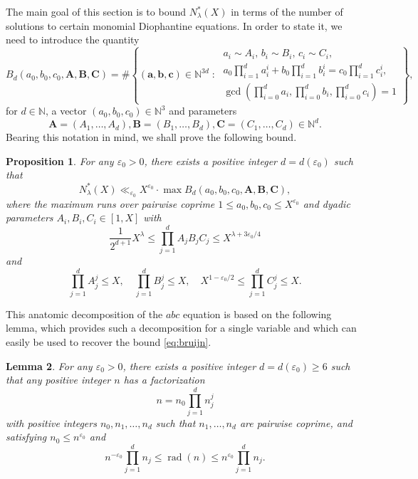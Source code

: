 \documentclass[a4paper,11pt,twoside,reqno]{amsart}
\def\ab{\mathbf{a}}
\def\bb{\mathbf{b}}
\def\cb{\mathbf{c}}
\def\Ab{\mathbf{A}}
\def\Bb{\mathbf{B}}
\def\Cb{\mathbf{C}}
\newcommand\NN{\mathbb{N}}
\renewcommand{\leq}{\leqslant}
\renewcommand{\le}{\leqslant}
\renewcommand{\geq}{\geqslant}
\theoremstyle{plain}
\newtheorem{prop}{Proposition}
\newtheorem{lemma}[prop]{Lemma}
\theoremstyle{remark}
\DeclareMathOperator\rad{rad}
\numberwithin{prop}{section}
\numberwithin{equation}{section}
\begin{document}
The main goal of this section is to bound 
$N_{\lambda}^*(X)$ 
in terms of the  number of solutions to certain monomial Diophantine equations. In order to state it, we need to introduce  the quantity
$$
B_d(a_0,b_0,c_0, \Ab,\Bb,\Cb)
=  \#\left\{
(\ab,\bb,\cb) \in \NN^{3d}
\;:\;
\begin{array}{l}
a_i \sim A_i,\, b_i \sim B_i,\, c_i \sim C_i,\\
a_0 \prod_{i=1}^d a_i^i+b_0\prod_{i=1}^d b_i^i=c_0 \prod_{i=1}^d c_i^i,\\
\gcd\left(\prod_{i=0}^d a_i, \prod_{i=0}^d b_i, \prod_{i=0}^d c_i\right)=1
\end{array}
\right\},
$$
for $d \in \NN$, a vector $(a_0,b_0,c_0) \in \NN^3$ and parameters 
$$
\Ab=(A_1,\dots,A_d), \Bb=(B_1,\dots,B_d), \Cb=(C_1,\dots,C_d) \in \NN^d.
$$
Bearing this notation in mind, we shall prove the following bound.

\begin{prop}\label{prop:reduction}
    For any $\varepsilon_0>0$, there exists a positive integer $d=d(\varepsilon_0)$ such that
    \[
    N_{\lambda}^*(X) \ll_{\varepsilon_0} X^{\varepsilon_0} \cdot \max B_d(a_0,b_0,c_0,\Ab,\Bb,\Cb),
    \]
    where the maximum runs over pairwise coprime $1\le a_0,b_0,c_0 \le X^{\varepsilon_0}$ and dyadic parameters $A_i,B_i,C_i \in [1,X]$ with
    \[
    \frac{1}{2^{d+1}}X^{\lambda}\leq 
    \prod_{j=1}^d A_jB_jC_j \le X^{\lambda+3\varepsilon_0/4}\]
    and
    \[\prod_{j=1}^d A_j^j \le X, \quad \prod_{j=1}^d B_j^j \le X, \quad X^{1-\varepsilon_0/2} \le \prod_{j=1}^d C_j^j \le X.\]
\end{prop}

This anatomic decomposition of the $abc$ equation is based on the following lemma, which provides such a decomposition for a single variable and which can easily be used to recover the bound 
\eqref{eq:bruijn}.

\begin{lemma}\label{lem:factorization}
    For any $\varepsilon_0>0$, there exists a positive integer $d=d(\varepsilon_0)\geq 6$ such that any positive integer $n$ has a factorization
    \[n=n_0 \prod_{j=1}^d n_j^j\]
    with positive integers $n_0,n_1,\dots,n_d$ such that $n_1,\dots,n_d$ are pairwise coprime, and satisfying $n_0 \le n^{\varepsilon_0}$ and
    \[n^{-\varepsilon_0} \prod_{j=1}^d n_j \le \rad(n) \le n^{\varepsilon_0} \prod_{j=1}^d n_j.\]
\end{lemma}
\end{document}
